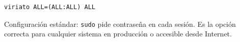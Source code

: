 \begin{tcolorbox}[colback=green!5, colframe=green!50!black,
  title=Configuración recomendada para \textbf{entornos reales}]
\begin{lstlisting}[style=bashstyle]
viriato ALL=(ALL:ALL) ALL
\end{lstlisting}
\tcblower
\scriptsize Configuración estándar: \texttt{sudo} pide contraseña en cada sesión.
Es la opción correcta para cualquier sistema en producción o accesible desde Internet.
\end{tcolorbox}
\newpage
